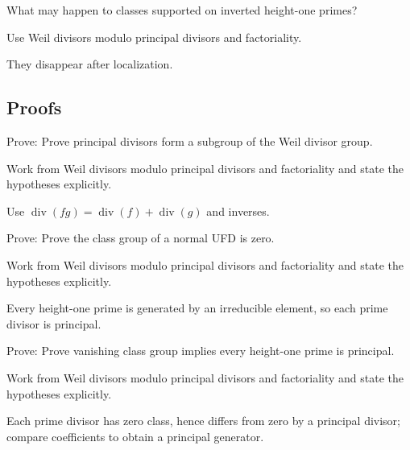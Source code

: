 \begin{exercise}[Localization]\label{exr:vi41-expand-05}
What may happen to classes supported on inverted height-one primes?
\end{exercise}
\begin{hint}
Use Weil divisors modulo principal divisors and factoriality.
\end{hint}
\begin{solution}
They disappear after localization.
\end{solution}

\subsection*{Proofs}

\begin{exercise}\label{exr:vi41-expand-06}
Prove: Prove principal divisors form a subgroup of the Weil divisor group.
\end{exercise}
\begin{hint}
Work from Weil divisors modulo principal divisors and factoriality and state the hypotheses explicitly.
\end{hint}
\begin{solution}
Use $\operatorname{div}(fg)=\operatorname{div}(f)+\operatorname{div}(g)$ and inverses.
\end{solution}

\begin{exercise}\label{exr:vi41-expand-07}
Prove: Prove the class group of a normal UFD is zero.
\end{exercise}
\begin{hint}
Work from Weil divisors modulo principal divisors and factoriality and state the hypotheses explicitly.
\end{hint}
\begin{solution}
Every height-one prime is generated by an irreducible element, so each prime divisor is principal.
\end{solution}

\begin{exercise}\label{exr:vi41-expand-08}
Prove: Prove vanishing class group implies every height-one prime is principal.
\end{exercise}
\begin{hint}
Work from Weil divisors modulo principal divisors and factoriality and state the hypotheses explicitly.
\end{hint}
\begin{solution}
Each prime divisor has zero class, hence differs from zero by a principal divisor; compare coefficients to obtain a principal generator.
\end{solution}

